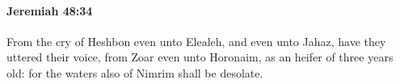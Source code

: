 
		\paragraph{Jeremiah 48:34} %
			\label{JEREMIAH-48-34}

			From the cry of Heshbon even unto Elealeh, and even unto Jahaz, have they uttered their voice, from Zoar even unto Horonaim, as an heifer of three years old: for the waters also of Nimrim shall be desolate.


